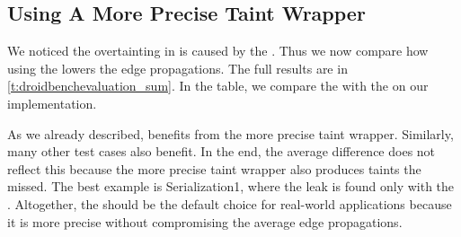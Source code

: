 \documentclass[../draft.tex]{subfiles}
\begin{document}
    \subsection{Using A More Precise Taint Wrapper}
    We noticed the overtainting in  is caused by the .
    Thus we now compare how using the  lowers the edge propagations.
    The full results are in \autoref{t:droidbenchevaluation_sum}. In the table, we compare the  with the  on our implementation. 
    
    As we already described,  benefits from the more precise taint wrapper. Similarly, many other test cases also benefit. In the end, the average difference does not reflect this because the more precise taint wrapper also produces taints the  missed. The best example is Serialization1, where the leak is found only with the . Altogether, the  should be the default choice for real-world applications because it is more precise without compromising the average edge propagations.
\end{document}
